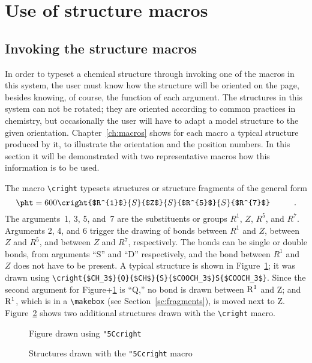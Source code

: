 \section{Use of structure macros}
\subsection{Invoking the structure macros}
 In order to typeset a chemical structure through invoking one
 of the macros in this system, the user must know how the structure
 will be oriented on  the page, besides knowing, of course,
 the function of each argument. The structures in this system can
 not be rotated; they are oriented according to common practices
 in chemistry, but occasionally the user will have to adapt
 a model structure to the given orientation. Chapter~\ref{ch:macros}
 shows
 for each macro a typical structure produced by it, to illustrate
 the orientation and the position numbers. In this section it
 will be demonstrated with two representative macros how this
 information is to be used.
 
 The macro \verb+\cright+ typesets structures or structure
 fragments of the general form
 $$\pht=600\cright{$R^{1}$}{S}{$Z$}{S}{$R^{5}$}{S}{$R^{7}$} \hspace{1cm}
    \mbox{.}$$
 The arguments~1, 3, 5, and~7 are the substituents or groups
 $R^{1}$, $Z$, $R^{5}$, and $R^{7}$. Arguments 2, 4, and 6 trigger
 the drawing of bonds between $R^{1}$ and $Z$, between $Z$ and $R^{5}$,
 and between $Z$ and $R^{7}$, respectively. The bonds can be single
 or double bonds, from arguments ``S'' and ``D'' respectively,
 and the bond between $R^{1}$ and $Z$ does not have to be present.
 A typical structure is shown in Figure~\ref{fg:crightexample};
 it was drawn using \verb+\cright{$CH_3$}{Q}{$CH$}{S}{$COOCH_3$}S{$COOCH_3$}+.
 Since the second argument for Figure+\ref{fg:crightexample}
 is ``Q,'' no bond is drawn between ${\rm R^{1}}$ and Z; and
 ${\rm R^{1}}$, which is in a \verb+\makebox+ (see Section~\ref{sc:fragments}),
 is moved next to Z. Figure~\ref{fg:crighttwo}
 shows two additional structures
 drawn with the \verb+\cright+ macro.
 
 \begin{figure}\centering
  \caption{Figure drawn using \tt\char"5C{}cright}
\label{fg:crightexample}
  \end{figure}
 
 
 \begin{figure}                %
  \hspace{3cm}
  \hspace{3cm}
  \caption{Structures drawn with the {\tt\char"5C{}cright} macro}
\label{fg:crighttwo}
 \end{figure}
 
